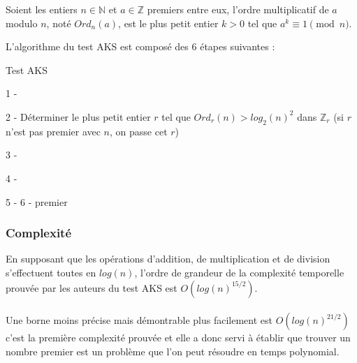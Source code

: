 		\vspace{-1.5em}\begin{adjustwidth}{1.5cm}{1.5cm} 
		\begin{Def}
			\label{OrdM}
			Soient les entiers $n \in \mathbb{N}$ et $a \in \mathbb{Z}$ premiers entre eux, l'ordre multiplicatif de $a$ modulo $n$, noté $Ord_{n}(a)$, est le plus petit entier $k > 0$ tel que $a^{k} \equiv 1 \pmod n$.
		\end{Def}
		\end{adjustwidth}\vspace{0.5em}
		
		L'algorithme du test AKS est composé des 6 étapes suivantes :\\
		
		\begin{algorithm}[H]
			\caption{Test AKS}\label{AKS}
			
			1 - 
			
            2 - Déterminer le plus petit entier $r$ tel que $Ord_{r}(n) > log_{2}(n)^{2}$ dans $\mathbb{Z}_{r}$ (si $r$ n'est pas premier avec $n$, on passe cet $r$)\;
			
            3 - 
            
            4 - 
            
            5 - 
			6 - \Retour premier\;
		\end{algorithm}
		
	\subsubsection{Complexité}
		En supposant que les opérations d'addition, de multiplication et de division s'effectuent toutes en $log(n)$, l'ordre de grandeur de la complexité temporelle prouvée par les auteurs du test AKS est $O(log(n)^{15/2})$.
		\paragraph{}Une borne moins précise mais démontrable plus facilement est $O(log(n)^{21/2})$ c'est la première complexité prouvée et elle a donc servi à établir que trouver un nombre premier est un problème que l'on peut résoudre en temps polynomial.
